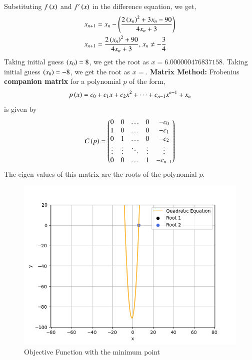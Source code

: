\documentclass[journal]{IEEEtran}
\begin{document}
\newline
Substituting $f\left(x\right)$ and $f^{\prime}\left(x\right)$ in the difference equation, we get,
\begin{align}
    x_{n + 1} &= x_n - \left(\frac{2\left(x_n\right)^2 + 3x_n - 90}{4x_n + 3}\right)\\
    x_{n + 1} &= \frac{2\left(x_n\right)^2 + 90}{4x_n + 3} \text{, } x_n \neq -\frac{3}{4}
\end{align}
Taking initial guess $\left(x_0\right) = 8$, we get the root as $x = 6.000000476837158$.
Taking initial guess $\left(x_0\right) = -8$, we get the root as $x = $.
\newline
\textbf{Matrix Method:}
Frobenius \textbf{companion matrix} for a polynomial $p$ of the form,
\begin{align}
    p\left(x\right) = c_0 + c_1x + c_2x^2 + \dots + c_{n - 1}x^{n - 1} + x_n
\end{align}
is given by
\begin{align}
    C\left(p\right) = \begin{pmatrix}0 & 0 & \dots & 0 & -c_0\\1 & 0 & \dots & 0 & -c_1\\0 & 1 & \dots & 0 & -c_2\\\vdots & \vdots & \ddots & \vdots & \vdots\\0 & 0 & \dots & 1 & -c_{n - 1}\end{pmatrix}
\end{align}
The eigen values of this matrix are the roots of the polynomial $p$.

\begin{figure}[h!]
   \centering
   \includegraphics[width=0.7\columnwidth]{figs/graph.png}
   \caption{Objective Function with the minimum point}
   \label{label}
\end{figure}
\end{document}
